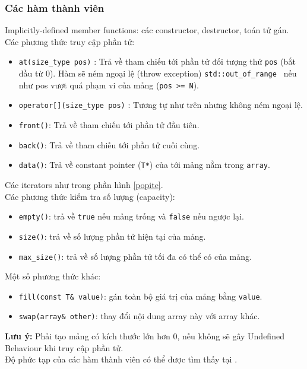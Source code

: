 \subsubsection{Các hàm thành viên}
Implicitly-defined member functions: các constructor, destructor, toán tử gán.\\
Các phương thức truy cập phần tử:
\begin{itemize}
    \item \lstinline{at(size_type pos)} : Trả về tham chiếu tới phần tử đối tượng thứ \lstinline{pos} (bắt đầu từ 0). Hàm sẽ ném ngoại lệ (throw exception) \lstinline{std::out_of_range } nếu như pos vượt quá phạm vi của mảng (\lstinline{pos >= N}).
    \item \lstinline{operator[](size_type pos)} : Tương tự như trên nhưng không ném ngoại lệ.
    \item \lstinline{front()}: Trả về tham chiếu tới phần tử đầu tiên.
    \item \lstinline{back()}: Trả về tham chiếu tới phần tử cuối cùng.
    \item \lstinline{data()}: Trả về constant pointer (\lstinline{T*}) của tới mảng nằm trong \lstinline{array}.
\end{itemize}
Các iterators như trong phần hình \ref{popite}.\\
Các phương thức kiểm tra số lượng (capacity):
\begin{itemize}
    \item \lstinline{empty()}: trả về \lstinline{true} nếu mảng trống và \lstinline{false} nếu ngược lại.
    \item \lstinline{size()}: trả về số lượng phần tử hiện tại của mảng.
    \item \lstinline{max_size()}: trả về số lượng phần tử tối đa có thể có của mảng.
\end{itemize}
Một số phương thức khác:
\begin{itemize}
    \item \lstinline{fill(const T& value)}: gán toàn bộ giá trị của mảng bằng \lstinline{value}.
    \item \lstinline{swap(array& other)}: thay đổi nội dung array này với array khác.
\end{itemize}
\textbf{Lưu ý:} Phải tạo mảng có kích thước lớn hơn 0, nếu không sẽ gây Undefined Behaviour  khi truy cập phần tử.\\
Độ phức tạp của các hàm thành viên có thể được tìm thấy tại \cite{array}.
